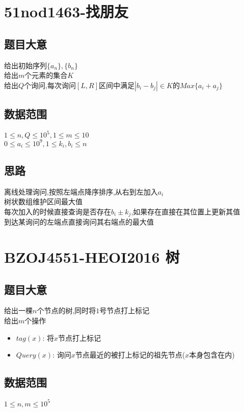 \documentclass{ctexart}
\numberwithin{equation}{section}
\begin{document}
\begin{flushleft}
  \section{51nod1463-找朋友}
  \subsection{题目大意}
  给出初始序列$\{a_n\},\{b_n\}$ \\
  给出$m$个元素的集合$K$ \\
  给出$Q$个询问,每次询问$[L,R]$区间中满足$|b_i-b_j|\in K$的$Max\{a_i+a_j\}$ \\
  \subsection{数据范围}
  $1\le n,Q\le 10^5,1\le m \le 10$ \\
  $0\le a_i \le 10^9,1\le k_i,b_i\le n$ \\ 
  \subsection{思路}
  离线处理询问,按照左端点降序排序,从右到左加入$a_i$ \\
  树状数组维护区间最大值 \\
  每次加入的时候直接查询是否存在$b_i \pm k_j$,如果存在直接在其位置上更新其值 \\
  到达某询问的左端点直接询问其右端点的最大值 \\
  \newpage

  \section{BZOJ4551-HEOI2016 树}
  \subsection{题目大意}
  给出一棵$n$个节点的树,同时将$1$号节点打上标记 \\
  给出$m$个操作\\
  \begin{itemize}
  \item $tag(x)$: 将$x$节点打上标记 
  \item $Query(x)$: 询问$x$节点最近的被打上标记的祖先节点($x$本身包含在内)
  \end{itemize} 
  \subsection{数据范围}
  $1\le n,m\le 10^5$ \\

\end{flushleft}
\end{document}
